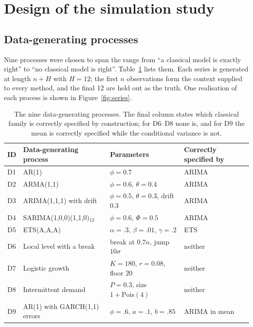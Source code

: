 \documentclass[article]{ajs}
\providecommand{\tableref}[1]{Table~\ref{#1}}
\providecommand{\figureref}[1]{Figure~\ref{#1}}
\begin{document}
\section{Design of the simulation study}
\label{sec:design}

\subsection{Data-generating processes}

Nine processes were chosen to span the range from ``a classical model is exactly right'' to
``no classical model is right''. \tableref{tab:dgps} lists them. Each series is generated at
length $n + H$ with $H = 12$; the first $n$ observations form the context supplied to every
method, and the final 12 are held out as the truth. One realisation of each process is shown
in \figureref{fig:series}.

\begin{table}[t!]
\centering
\caption{The nine data-generating processes. The final column states which classical family is
correctly specified by construction; for D6--D8 none is, and for D9 the mean is correctly
specified while the conditional variance is not.}
\label{tab:dgps}
\small
\setlength{\tabcolsep}{4pt}
\begin{tabular}{llll}
\toprule
ID & Data-generating process & Parameters & Correctly specified by \\
\midrule
D1 & AR(1)                        & $\phi = 0.7$                                & ARIMA \\
D2 & ARMA(1,1)                    & $\phi = 0.6$, $\theta = 0.4$                & ARIMA \\
D3 & ARIMA(1,1,1) with drift      & $\phi = 0.5$, $\theta = 0.3$, drift $0.3$   & ARIMA \\
D4 & SARIMA(1,0,0)(1,1,0)$_{12}$  & $\phi = 0.6$, $\Phi = 0.5$                  & ARIMA \\
D5 & ETS(A,A,A)                   & $\alpha = .3$, $\beta = .01$, $\gamma = .2$ & ETS \\
D6 & Local level with a break     & break at $0.7n$, jump $10\sigma$            & neither \\
D7 & Logistic growth              & $K = 180$, $r = 0.08$, floor $20$           & neither \\
D8 & Intermittent demand          & $P = 0.3$, size $1 + \mathrm{Pois}(4)$      & neither \\
D9 & AR(1) with GARCH(1,1) errors & $\phi = .6$, $a = .1$, $b = .85$            & ARIMA in mean \\
\bottomrule
\end{tabular}
\end{table}
\end{document}
